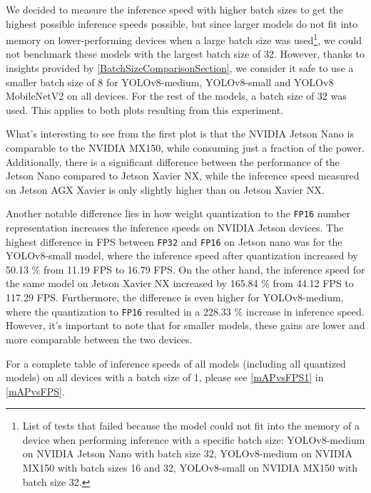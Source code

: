 \newpage
We decided to measure the inference speed with higher batch sizes to get the
highest possible inference speeds possible, but since larger models do not fit
into memory on
lower-performing devices when a large batch size was
used\footnote{List of tests that failed because the model could not fit into
the memory of a device when performing inference with a specific batch size:
YOLOv8-medium on NVIDIA Jetson Nano with batch size 32, YOLOv8-medium on NVIDIA
MX150 with batch sizes 16 and 32, YOLOv8-small on NVIDIA MX150 with batch size
32.}, we could not benchmark these models with the largest batch size of 32.
However, thanks to insights provided by \autoref{BatchSizeComparisonSection}, we
consider it safe to use a smaller batch size of 8 for YOLOv8-medium,
YOLOv8-small and YOLOv8 MobileNetV2 on all devices. For the rest of the models,
a batch size of 32 was used. This applies to both plots resulting from this
experiment.

What's interesting to see from the first plot is that the NVIDIA Jetson Nano is
comparable to the NVIDIA MX150, while consuming just a fraction of the power.
Additionally, there is a significant difference between the performance of the
Jetson Nano compared to Jetson Xavier NX, while the inference speed measured on
Jetson AGX Xavier is only slightly higher than on Jetson Xavier NX.

Another notable difference lies in how weight quantization to the \texttt{FP16}
number representation increases the inference speeds on NVIDIA Jetson devices.
The highest difference in FPS between \texttt{FP32} and \texttt{FP16} on Jetson
nano was for the YOLOv8-small model, where the inference speed after
quantization increased by \num{50.13} \% from \num{11.19} FPS to \num{16.79}
FPS. On the other hand, the inference speed for the same model on Jetson Xavier
NX increased by \num{165.84} \% from \num{44.12} FPS to \num{117.29} FPS.
Furthermore, the difference is even higher for YOLOv8-medium, where the
quantization to \texttt{FP16} resulted in a \num{228.33} \% increase in
inference speed. However, it's important to note that for smaller models, these
gains are lower and more comparable between the two devices.

For a complete table of inference speeds of all models (including all quantized
models) on all devices with a batch size of 1, please see \autoref{mAPvsFPS1} in
\autoref{mAPvsFPS}.

